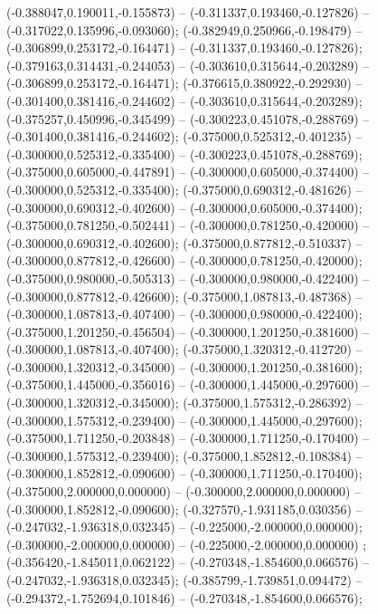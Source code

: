  (-0.388047,0.190011,-0.155873) -- (-0.311337,0.193460,-0.127826) -- (-0.317022,0.135996,-0.093060);
 (-0.382949,0.250966,-0.198479) -- (-0.306899,0.253172,-0.164471) -- (-0.311337,0.193460,-0.127826);
 (-0.379163,0.314431,-0.244053) -- (-0.303610,0.315644,-0.203289) -- (-0.306899,0.253172,-0.164471);
 (-0.376615,0.380922,-0.292930) -- (-0.301400,0.381416,-0.244602) -- (-0.303610,0.315644,-0.203289);
 (-0.375257,0.450996,-0.345499) -- (-0.300223,0.451078,-0.288769) -- (-0.301400,0.381416,-0.244602);
 (-0.375000,0.525312,-0.401235) -- (-0.300000,0.525312,-0.335400) -- (-0.300223,0.451078,-0.288769);
 (-0.375000,0.605000,-0.447891) -- (-0.300000,0.605000,-0.374400) -- (-0.300000,0.525312,-0.335400);
 (-0.375000,0.690312,-0.481626) -- (-0.300000,0.690312,-0.402600) -- (-0.300000,0.605000,-0.374400);
 (-0.375000,0.781250,-0.502441) -- (-0.300000,0.781250,-0.420000) -- (-0.300000,0.690312,-0.402600);
 (-0.375000,0.877812,-0.510337) -- (-0.300000,0.877812,-0.426600) -- (-0.300000,0.781250,-0.420000);
 (-0.375000,0.980000,-0.505313) -- (-0.300000,0.980000,-0.422400) -- (-0.300000,0.877812,-0.426600);
 (-0.375000,1.087813,-0.487368) -- (-0.300000,1.087813,-0.407400) -- (-0.300000,0.980000,-0.422400);
 (-0.375000,1.201250,-0.456504) -- (-0.300000,1.201250,-0.381600) -- (-0.300000,1.087813,-0.407400);
 (-0.375000,1.320312,-0.412720) -- (-0.300000,1.320312,-0.345000) -- (-0.300000,1.201250,-0.381600);
 (-0.375000,1.445000,-0.356016) -- (-0.300000,1.445000,-0.297600) -- (-0.300000,1.320312,-0.345000);
 (-0.375000,1.575312,-0.286392) -- (-0.300000,1.575312,-0.239400) -- (-0.300000,1.445000,-0.297600);
 (-0.375000,1.711250,-0.203848) -- (-0.300000,1.711250,-0.170400) -- (-0.300000,1.575312,-0.239400);
 (-0.375000,1.852812,-0.108384) -- (-0.300000,1.852812,-0.090600) -- (-0.300000,1.711250,-0.170400);
 (-0.375000,2.000000,0.000000) -- (-0.300000,2.000000,0.000000) -- (-0.300000,1.852812,-0.090600);
 (-0.327570,-1.931185,0.030356) -- (-0.247032,-1.936318,0.032345) -- (-0.225000,-2.000000,0.000000);
 (-0.300000,-2.000000,0.000000) -- (-0.225000,-2.000000,0.000000) ;
 (-0.356420,-1.845011,0.062122) -- (-0.270348,-1.854600,0.066576) -- (-0.247032,-1.936318,0.032345);
 (-0.385799,-1.739851,0.094472) -- (-0.294372,-1.752694,0.101846) -- (-0.270348,-1.854600,0.066576);

